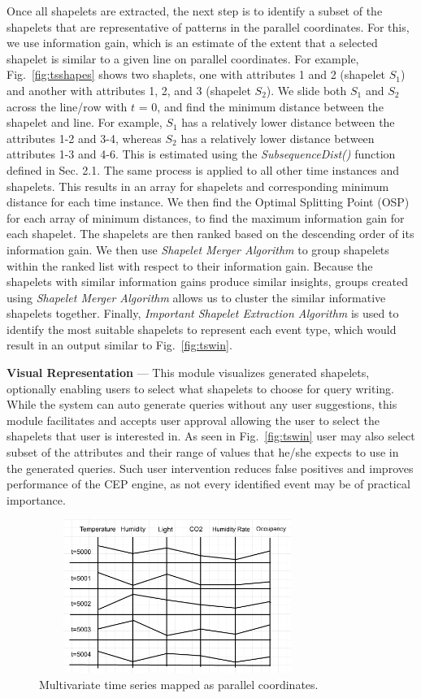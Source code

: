 \documentclass[conference]{IEEEtran}  %
\begin{document}
Once all shapelets are extracted, the next step is to identify a subset of the shapelets that are representative of patterns in the parallel coordinates. For this, we use information gain, which is an estimate of the extent that a selected shapelet is similar to a given line on parallel coordinates. For example, Fig.~\ref{fig:tsshapes} shows two shaplets, one with attributes 1 and 2 (shapelet $S_1$) and another with attributes 1, 2, and 3 (shapelet $S_2$). We slide both $S_1$ and $S_2$ across the line/row with $t$ = 0, and find the minimum distance between the shapelet and line. For example, $S_1$ has a relatively lower distance between the attributes 1-2 and 3-4, whereas $S_2$ has a relatively lower distance between attributes 1-3 and 4-6. This is estimated using the \textit{SubsequenceDist()} function defined in Sec. 2.1. The same process is applied to all other time instances and shapelets. This results in an array for shapelets and corresponding minimum distance for each time instance. We then find the Optimal Splitting Point (OSP) \cite{IEEEexample:TimeSeriesShapelets} for each array of minimum distances, to find the maximum information gain for each shapelet. The shapelets are then ranked based on the descending order of its information gain. We then use \textit{Shapelet Merger Algorithm} to group shapelets within the ranked list with respect to their information gain. Because the shapelets with similar information gains produce similar insights, groups created using \textit{Shapelet Merger Algorithm} allows us to cluster the similar informative shapelets together. Finally, \textit{Important Shapelet Extraction Algorithm} is used to identify the most suitable shapelets to represent each event type, which would result in an output similar to Fig.~\ref{fig:tswin}.

\textbf{Visual Representation} --- This module visualizes generated shapelets, optionally enabling users to select what shapelets to choose for query writing. While the system can auto generate queries without any user suggestions, this module facilitates and accepts user approval allowing the user to select the shapelets that user is interested in. As seen in Fig.~\ref{fig:tswin} user may also select subset of the attributes and their range of values that he/she expects to use in the generated queries. Such user intervention reduces false positives and improves performance of the CEP engine, as not every identified event may be of practical importance.

\begin{figure}
\includegraphics[width=9cm,height=5cm]{multivariateTime.png}
\caption{Multivariate time series mapped as parallel coordinates.}
\label{fig:tsdata}
\end{figure}
\end{document}
